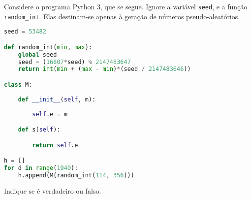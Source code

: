 \documentclass[12pt,varwidth=16cm,border=17pt]{standalone}
\begin{document}
Considere o programa Python 3, que se segue. Ignore a variável \verb+seed+, e a função \verb+random_int+. 
Elas destinam-se apenas à geração de números pseudo-aleatórios.

\begin{lstlisting}[language=Python]
seed = 53482

def random_int(min, max):
    global seed
    seed = (16807*seed) % 2147483647
    return int(min + (max - min)*(seed / 2147483646))

class M:
    
    def __init__(self, m):
        
        self.e = m

    def s(self):

        return self.e

h = []
for d in range(1940):
    h.append(M(random_int(114, 356)))
\end{lstlisting}

Indique se é verdadeiro ou falso.
\end{document}
